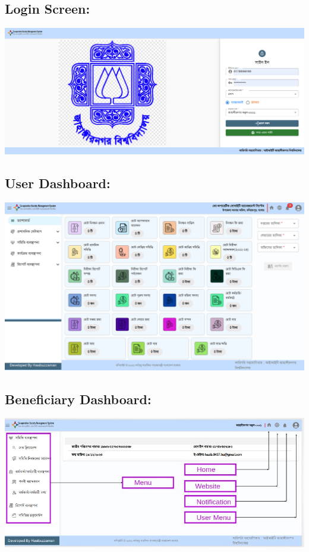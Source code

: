 \subsection{Login Screen:}
  \includegraphics[width=14cm]{Chap4/2.png}
  
\subsection{User Dashboard:}
  \includegraphics[width=14cm]{Chap4/3.png}

\subsection{Beneficiary Dashboard:}
  \includegraphics[width=14cm]{Chap4/4.jpeg}

